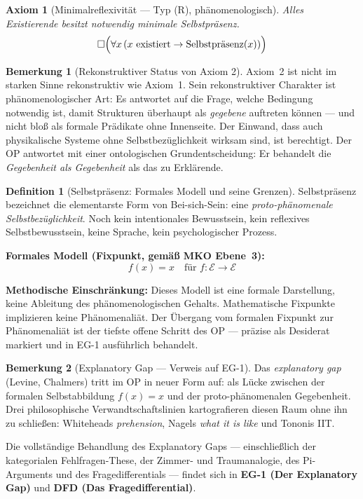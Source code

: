 \documentclass[11pt,a4paper]{article}
\theoremstyle{plain}
\newtheorem{axiom}{Axiom}[section]
\theoremstyle{definition}
\newtheorem{definition}{Definition}[section]
\newtheorem{remark}{Bemerkung}[section]
\begin{document}
\begin{axiom}[Minimalreflexivit\"{a}t \textnormal{--- Typ (R), ph\"{a}nomenologisch}]
Alles Existierende besitzt notwendig minimale Selbstpr\"{a}senz.
\[
  \Box\Bigl(\forall x\,(x\text{ existiert}\rightarrow\text{Selbstpr\"{a}senz}(x))\Bigr)
\]
\end{axiom}

\begin{remark}[Rekonstruktiver Status von Axiom 2]
Axiom~2 ist nicht im starken Sinne rekonstruktiv wie Axiom~1. Sein rekonstruktiver
Charakter ist ph\"{a}nomenologischer Art: Es antwortet auf die Frage, welche Bedingung
notwendig ist, damit Strukturen \"{u}berhaupt als \emph{gegebene} auftreten k\"{o}nnen
--- und nicht blo\ss{} als formale Pr\"{a}dikate ohne Innenseite. Der Einwand, dass auch
physikalische Systeme ohne Selbstbez\"{u}glichkeit \glqq{}wirksam\grqq{} sind, ist
berechtigt. Der OP antwortet mit einer ontologischen Grundentscheidung: Er behandelt die
\emph{Gegebenheit als Gegebenheit} als das zu Erkl\"{a}rende.
\end{remark}

\begin{definition}[Selbstpr\"{a}senz: Formales Modell und seine Grenzen]
Selbstpr\"{a}senz bezeichnet die elementarste Form von Bei-sich-Sein: eine
\emph{proto-ph\"{a}nomenale Selbstbez\"{u}glichkeit}. Noch kein intentionales Bewusstsein,
kein reflexives Selbstbewusstsein, keine Sprache, kein psychologischer Prozess.

\textbf{Formales Modell (Fixpunkt, gem\"{a}\ss{} MKO Ebene~3):}
\[
  f(x) = x \quad \text{f\"{u}r } f\colon\mathcal{E}\to\mathcal{E}
\]

\textbf{Methodische Einschr\"{a}nkung:} Dieses Modell ist eine formale Darstellung,
keine Ableitung des ph\"{a}nomenologischen Gehalts. Mathematische Fixpunkte implizieren
keine Ph\"{a}nomenali\"{a}t. Der \"{U}bergang vom formalen Fixpunkt zur Ph\"{a}nomenali\"{a}t
ist der tiefste offene Schritt des OP --- pr\"{a}zise als Desiderat markiert und in
EG-1 ausf\"{u}hrlich behandelt.
\end{definition}

\begin{remark}[Explanatory Gap --- Verweis auf EG-1]
Das \emph{explanatory gap} (Levine, Chalmers) tritt im OP in neuer Form auf: als L\"{u}cke
zwischen der formalen Selbstabbildung $f(x)=x$ und der proto-ph\"{a}nomenalen Gegebenheit.
Drei philosophische Verwandtschaftslinien kartografieren diesen Raum ohne ihn zu
schlie\ss{}en: Whiteheads \emph{prehension}, Nagels \emph{what it is like} und Tononis IIT.

Die vollst\"{a}ndige Behandlung des Explanatory Gaps --- einschlie\ss{}lich der kategorialen
Fehlfragen-These, der Zimmer- und Traumanalogie, des Pi-Arguments und des
Fragedifferentials --- findet sich in \textbf{EG-1 (Der Explanatory Gap)} und
\textbf{DFD (Das Fragedifferential)}.
\end{remark}
\end{document}
